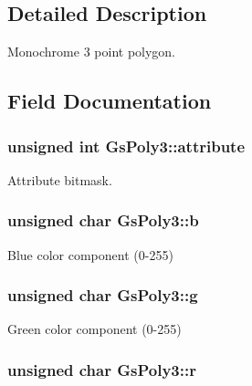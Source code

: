 \subsection{Detailed Description}
Monochrome 3 point polygon. 

\subsection{Field Documentation}
\hypertarget{structGsPoly3_af984f057fe145257779d682611a506ca}{}
\subsubsection[{attribute}]{\setlength{\rightskip}{0pt plus 5cm}unsigned int Gs\+Poly3\+::attribute}\label{structGsPoly3_af984f057fe145257779d682611a506ca}


Attribute bitmask. 

\hypertarget{structGsPoly3_a5fd31be0e0f4318c79eba5f6b0fbf407}{}
\subsubsection[{b}]{\setlength{\rightskip}{0pt plus 5cm}unsigned char Gs\+Poly3\+::b}\label{structGsPoly3_a5fd31be0e0f4318c79eba5f6b0fbf407}


Blue color component (0-\/255) 

\hypertarget{structGsPoly3_a22f16d37acb1952cac431d182640383a}{}
\subsubsection[{g}]{\setlength{\rightskip}{0pt plus 5cm}unsigned char Gs\+Poly3\+::g}\label{structGsPoly3_a22f16d37acb1952cac431d182640383a}


Green color component (0-\/255) 

\hypertarget{structGsPoly3_ad6e5d6f90f65bb68d79afcc618aa0561}{}
\subsubsection[{r}]{\setlength{\rightskip}{0pt plus 5cm}unsigned char Gs\+Poly3\+::r}\label{structGsPoly3_ad6e5d6f90f65bb68d79afcc618aa0561}


